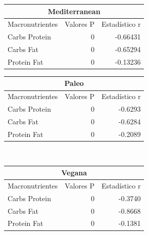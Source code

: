 \documentclass[12pt,a4paper]{article}
\begin{document}
{{            \begin{minipage}{0.5\textwidth}
                \centering                
                \begin{tabular}{lrr}
                    \toprule
                    \multicolumn{3}{c}{Mediterranean}\\
                    \midrule
                        Macronutrientes & Valores P & Estadístico r \\
                    \midrule
                        Carbs Protein & 0 & -0.66431 \\
                       Carbs Fat     & 0 & -0.65294 \\
                        Protein Fat   & 0 & -0.13236 \\
                    \bottomrule
                \end{tabular}
            \end{minipage}%
            \begin{minipage}{0.5\textwidth}
                \centering                
                \begin{tabular}{lrr}
                    \toprule
                    \multicolumn{3}{c}{Paleo}\\
                    \midrule
                        Macronutrientes & Valores P & Estadístico r \\
                    \midrule
                        Carbs Protein & 0 & -0.6293 \\
                        Carbs Fat     & 0 & -0.6284 \\
                        Protein Fat   & 0 & -0.2089 \\
                    \bottomrule
                \end{tabular}
            \end{minipage}\\

            \begin{center}
                \begin{tabular}{lrr}
                    \toprule
                    \multicolumn{3}{c}{Vegana}\\
                    \midrule
                        Macronutrientes & Valores P & Estadístico r \\
                    \midrule
                        Carbs Protein & 0 & -0.3740 \\
                        Carbs Fat     & 0 & -0.8668 \\
                        Protein Fat   & 0 & -0.1381 \\
                    \bottomrule
                \end{tabular}
            \end{center}

}}
\end{document}

